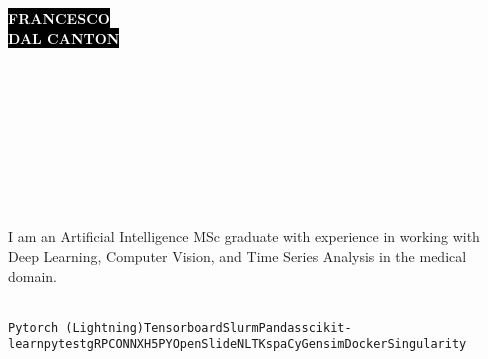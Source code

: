 \documentclass[9pt]{developercv}
\begin{document}

\begin{minipage}[t]{0.45\textwidth}
    \vspace{-\baselineskip}
    \colorbox{black}{{\fontsize{26}{0}\textcolor{white}{\textbf{\MakeUppercase{Francesco}}}}}\\    
    \colorbox{black}{{\fontsize{26}{0}\textcolor{white}{\textbf{\MakeUppercase{Dal Canton}}}}}\\
\end{minipage}
\begin{minipage}[t]{0.27\textwidth}
    \vspace{-\baselineskip}
    \\
    \\
    \\
\end{minipage}
\begin{minipage}[t]{0.28\textwidth}
    \vspace{-\baselineskip}
    \\
    \\
    \\
\end{minipage}

\vspace{1.5cm}


\begin{minipage}[t]{0.45\textwidth}
    \vspace{-\baselineskip}
    \\
    I am an Artificial Intelligence MSc graduate with experience in working with Deep Learning, Computer Vision, and Time Series Analysis in the medical domain.
\end{minipage}
\hfill
\begin{minipage}[t]{0.45\textwidth}
    \vspace{-\baselineskip}
    \\
    \texttt{Pytorch (Lightning)}\slashsep\texttt{Tensorboard}\slashsep\texttt{Slurm}\slashsep\texttt{Pandas}\slashsep\texttt{scikit-learn}\slashsep\texttt{pytest}\slashsep\texttt{gRPC}\slashsep\texttt{ONNX}\slashsep\texttt{H5PY}\slashsep\texttt{OpenSlide}\slashsep\texttt{NLTK}\slashsep\texttt{spaCy}\slashsep\texttt{Gensim}\slashsep\texttt{Docker}\slashsep\texttt{Singularity}
\end{minipage}
\end{document}
